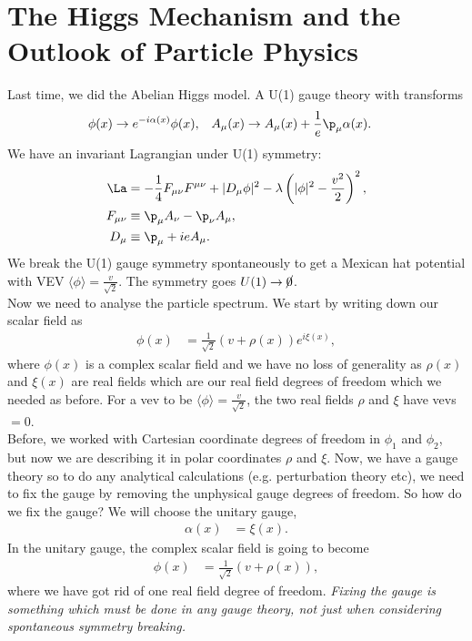 \documentclass[a4paper, 11pt, normalem]{report}
\begin{document}
\chapter{The Higgs Mechanism and the Outlook of Particle Physics}
Last time, we did the Abelian Higgs model.
A U(1) gauge theory with transforms
\begin{align}
    \phi(x) &\to e^{-i\alpha(x)}\phi(x), & A_\mu(x) &\to A_\mu(x)+\frac{1}{e}\p_\mu\alpha(x).
\end{align}
We have an invariant Lagrangian under U(1) symmetry:
\begin{align}
    \La &= -\frac14F_{\mu\nu}F^{\mu\nu} + |D_\mu\phi|^2 - \lambda\left(|\phi|^2-\frac{v^2}{2}\right)^2,\\
    F_{\mu\nu} &\equiv \p_\mu A_\nu - \p_\nu A_\mu, \\
    D_\mu &\equiv \p_\mu + ieA_\mu.
\end{align}
We break the U(1) gauge symmetry spontaneously to get a Mexican hat potential with VEV $\langle\phi\rangle=\frac{v}{\sqrt{2}}$.
The symmetry goes $U(1)\to\cancel{0}$.\\
Now we need to analyse the particle spectrum.
We start by writing down our scalar field as
\begin{align}
    \phi(x) &= \frac{1}{\sqrt{2}}\left(v+\rho(x)\right)e^{i\xi(x)},
\end{align}
where $\phi(x)$ is a complex scalar field and we have no loss of generality as $\rho(x)$ and $\xi(x)$ are real fields which are our real field degrees of freedom which we needed as before.
For a vev to be $\langle\phi\rangle=\frac{v}{\sqrt{2}}$, the two real fields $\rho$ and $\xi$ have vevs $=0$.\\
Before, we worked with Cartesian coordinate degrees of freedom in $\phi_1$ and $\phi_2$, but now we are describing it in polar coordinates $\rho$ and $\xi$.
Now, we have a gauge theory so to do any analytical calculations (e.g. perturbation theory etc), we need to fix the gauge by removing the unphysical gauge degrees of freedom.
So how do we fix the gauge?
We will choose the unitary gauge,
\begin{align}
    \alpha(x) &= \xi(x).
\end{align}
In the unitary gauge, the complex scalar field is going to become
\begin{align}
    \phi(x) &= \frac{1}{\sqrt{2}}(v+\rho(x)),
\end{align}
where we have got rid of one real field degree of freedom.
\emph{Fixing the gauge is something which must be done in any gauge theory, not just when considering spontaneous symmetry breaking.}
\end{document}
